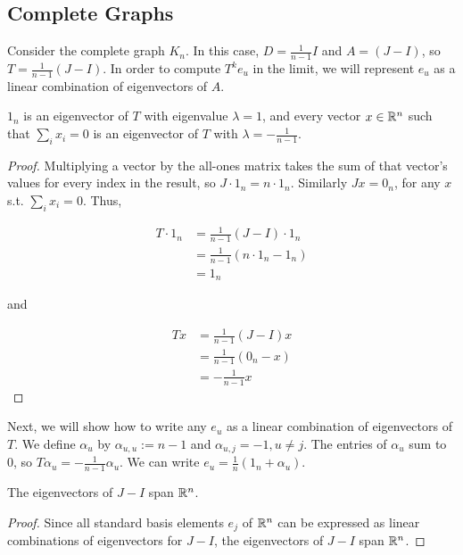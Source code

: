 \subsection{Complete Graphs}
Consider the complete graph $K_n$. In this case, $D = \frac{1}{n-1}I$ and
$A = (J - I)$, so $T=\frac{1}{n-1}(J-I)$. In order to compute $T^ke_u$ in the
limit, we will represent $e_u$ as a linear combination of eigenvectors of $A$.

\begin{remark}
  $1_n$ is an eigenvector of $T$ with eigenvalue $\lambda = 1$, and every
  vector $x \in \mathbb{R}^n$ such that $\sum_i x_i = 0$ is an eigenvector of $T$ with
  $\lambda = -\frac{1}{n-1}$.
\end{remark}
\begin{proof}
  Multiplying a vector by the all-ones matrix takes the sum of that vector's
  values for every index in the result, so $J \cdot 1_n = n \cdot 1_n$.
  Similarly $Jx = 0_n$, for any $x$ s.t. $\sum_i x_i = 0$. Thus,

  \begin{align*}
    T\cdot 1_n &= \frac{1}{n-1}(J-I) \cdot 1_n \\
               &= \frac{1}{n-1}(n\cdot 1_n - 1_n) \\
               &= 1_n
  \end{align*}

  and

  \begin{align*}
    Tx &= \frac{1}{n-1}(J-I)x \\
       &= \frac{1}{n-1}(0_n - x) \\
       &= -\frac{1}{n-1}x
  \end{align*}
\end{proof}


Next, we will show how to write any $e_u$ as a linear combination of
eigenvectors of $T$. We define $\alpha_u$ by $\alpha_{u,u} := n-1$ and
$\alpha_{u,j} = -1, u\neq j$. The entries of $\alpha_u$ sum to $0$, so
$T\alpha_u=-\frac{1}{n-1}\alpha_u$. We can write
$e_u = \frac{1}{n}(1_n + \alpha_u)$.

\begin{corollary}
  The eigenvectors of $J-I$ span $\mathbb{R}^n$.
\end{corollary}
\begin{proof}
  Since all standard basis elements $e_j$ of $\mathbb{R}^n$ can be expressed as linear
  combinations of eigenvectors for $J-I$, the eigenvectors of $J-I$ span $\mathbb{R}^n$.
\end{proof}

